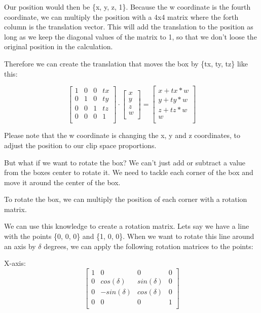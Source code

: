 \documentclass[12pt]{report} \usepackage{preamble}
\begin{document}
Our position would then be \{x, y, z, 1\}. Because the w coordinate is the
fourth coordinate, we can multiply the position with a 4x4 matrix where
the forth column is the translation vector. This will add the translation
to the position as long as we keep the diagonal values of the matrix to 1,
so that we don't loose the original position in the calculation.

Therefore we can create the translation that moves the box by \{tx, ty, tz\}
like this:

\[
	\begin{bmatrix}
		1 & 0 & 0 & tx \\
		0 & 1 & 0 & ty \\
		0 & 0 & 1 & tz \\
		0 & 0 & 0 & 1  \\
	\end{bmatrix}
	\cdot
	\begin{bmatrix}
		x \\
		y \\
		z \\
		w \\
	\end{bmatrix}
	=
	\begin{bmatrix}
		x + tx*w \\
		y + ty*w \\
		z + tz*w \\
		w        \\
	\end{bmatrix}
\]

Please note that the w coordinate is changing the x, y and z coordinates,
to adjust the position to our clip space proportions.

But what if we want to rotate the box? We can't just add or
subtract a value from the boxes center to rotate it. We need to tackle each
corner of the box and move it around the center of the box.

To rotate the box, we can multiply the position of each corner with a
rotation matrix.

We can use this knowledge to create a rotation matrix. Lets say we have a line with
the points \{0, 0, 0\} and \{1, 0, 0\}.
When we want to rotate this line around an axis by \(\delta\) degrees, we can apply
the following rotation matrices to the points:

X-axis: \[
	\begin{bmatrix}
		1 & 0            & 0           & 0 \\
		0 & cos(\delta)  & sin(\delta) & 0 \\
		0 & -sin(\delta) & cos(\delta) & 0 \\
		0 & 0            & 0           & 1 \\
	\end{bmatrix}
\]
\end{document}

